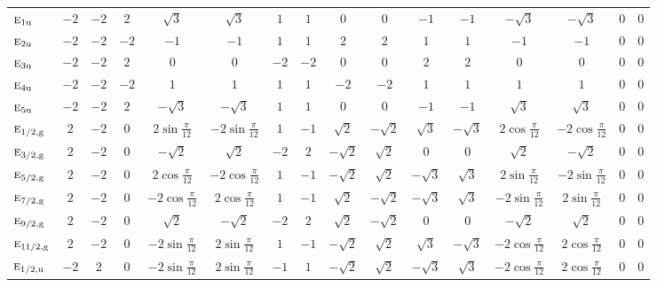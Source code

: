 \documentclass[10pt,a4paper]{article}
\makeatletter
\def\grouprule#1#2{\noalign{\marks\LTgroupmarks{\the\belowrulesep}\nobreak\vskip#1%
  \vskip\aboverulesep}\multispan\LT@cols\unskip{\leaders\hrule\@height#2\hfill\kern\z@}\cr
  \noalign{\penalty\LTrulebreak\vskip\belowrulesep\global\@lastruleclass\z@}}
\numberwithin{equation}{section}
\newcommand{\irr}[1]{\text{\normalfont\scshape #1}}
\newcommand{\ptag}[1]{\mathrm{#1}}
\makeatother
\begin{document}
{{\begin{longtable}{@{}lccccccccccccccc@{}}
$\irr{e}_{1\ptag{u}}$ & $-2$ & $-2$ & $2$ & $\sqrt{3}$ & $\sqrt{3}$ & $1$ & $1$ & $0$ & $0$ & $-1$ & $-1$ & $-\sqrt{3}$ & $-\sqrt{3}$ & $0$ & $0$\\
$\irr{e}_{2\ptag{u}}$ & $-2$ & $-2$ & $-2$ & $-1$ & $-1$ & $1$ & $1$ & $2$ & $2$ & $1$ & $1$ & $-1$ & $-1$ & $0$ & $0$\\
$\irr{e}_{3\ptag{u}}$ & $-2$ & $-2$ & $2$ & $0$ & $0$ & $-2$ & $-2$ & $0$ & $0$ & $2$ & $2$ & $0$ & $0$ & $0$ & $0$\\
$\irr{e}_{4\ptag{u}}$ & $-2$ & $-2$ & $-2$ & $1$ & $1$ & $1$ & $1$ & $-2$ & $-2$ & $1$ & $1$ & $1$ & $1$ & $0$ & $0$\\
$\irr{e}_{5\ptag{u}}$ & $-2$ & $-2$ & $2$ & $-\sqrt{3}$ & $-\sqrt{3}$ & $1$ & $1$ & $0$ & $0$ & $-1$ & $-1$ & $\sqrt{3}$ & $\sqrt{3}$ & $0$ & $0$\\
\grouprule{0pt}{\lightrulewidth}
$\irr{e}_{1/2,\ptag{g}}$ & $2$ & $-2$ & $0$ & $2\sin\tfrac{\pi}{12}$ & $-2\sin\tfrac{\pi}{12}$ & $1$ & $-1$ & $\sqrt{2}$ & $-\sqrt{2}$ & $\sqrt{3}$ & $-\sqrt{3}$ & $2\cos\tfrac{\pi}{12}$ & $-2\cos\tfrac{\pi}{12}$ & $0$ & $0$\\
$\irr{e}_{3/2,\ptag{g}}$ & $2$ & $-2$ & $0$ & $-\sqrt{2}$ & $\sqrt{2}$ & $-2$ & $2$ & $-\sqrt{2}$ & $\sqrt{2}$ & $0$ & $0$ & $\sqrt{2}$ & $-\sqrt{2}$ & $0$ & $0$\\
$\irr{e}_{5/2,\ptag{g}}$ & $2$ & $-2$ & $0$ & $2\cos\tfrac{\pi}{12}$ & $-2\cos\tfrac{\pi}{12}$ & $1$ & $-1$ & $-\sqrt{2}$ & $\sqrt{2}$ & $-\sqrt{3}$ & $\sqrt{3}$ & $2\sin\tfrac{\pi}{12}$ & $-2\sin\tfrac{\pi}{12}$ & $0$ & $0$\\
$\irr{e}_{7/2,\ptag{g}}$ & $2$ & $-2$ & $0$ & $-2\cos\tfrac{\pi}{12}$ & $2\cos\tfrac{\pi}{12}$ & $1$ & $-1$ & $\sqrt{2}$ & $-\sqrt{2}$ & $-\sqrt{3}$ & $\sqrt{3}$ & $-2\sin\tfrac{\pi}{12}$ & $2\sin\tfrac{\pi}{12}$ & $0$ & $0$\\
$\irr{e}_{9/2,\ptag{g}}$ & $2$ & $-2$ & $0$ & $\sqrt{2}$ & $-\sqrt{2}$ & $-2$ & $2$ & $\sqrt{2}$ & $-\sqrt{2}$ & $0$ & $0$ & $-\sqrt{2}$ & $\sqrt{2}$ & $0$ & $0$\\
$\irr{e}_{11/2,\ptag{g}}$ & $2$ & $-2$ & $0$ & $-2\sin\tfrac{\pi}{12}$ & $2\sin\tfrac{\pi}{12}$ & $1$ & $-1$ & $-\sqrt{2}$ & $\sqrt{2}$ & $\sqrt{3}$ & $-\sqrt{3}$ & $-2\cos\tfrac{\pi}{12}$ & $2\cos\tfrac{\pi}{12}$ & $0$ & $0$\\
$\irr{e}_{1/2,\ptag{u}}$ & $-2$ & $2$ & $0$ & $-2\sin\tfrac{\pi}{12}$ & $2\sin\tfrac{\pi}{12}$ & $-1$ & $1$ & $-\sqrt{2}$ & $\sqrt{2}$ & $-\sqrt{3}$ & $\sqrt{3}$ & $-2\cos\tfrac{\pi}{12}$ & $2\cos\tfrac{\pi}{12}$ & $0$ & $0$\\

\end{longtable}}}
\end{document}
